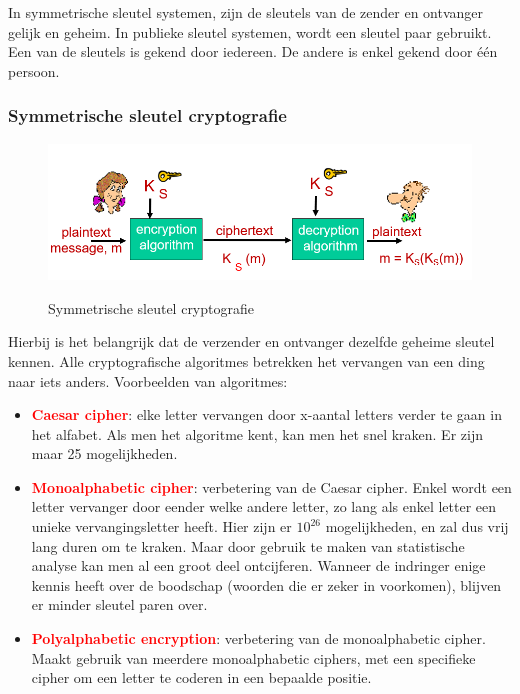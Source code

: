 In symmetrische sleutel systemen, zijn de sleutels van de zender en ontvanger gelijk en geheim.
In publieke sleutel systemen, wordt een sleutel paar gebruikt. Een van de sleutels is gekend door iedereen. De andere is enkel gekend door één persoon.

\subsubsection{Symmetrische sleutel cryptografie}

\begin{figure}[h]
    \centering
    \includegraphics[width=7in]{./img/imghfdst8/hfdst8puntje3.png}\\[1cm]
    \caption{Symmetrische sleutel cryptografie }      
    \label{fig:Symmetrische sleutel cryptografie }
\end{figure}


Hierbij is het belangrijk dat de verzender en ontvanger dezelfde geheime sleutel kennen.
Alle cryptografische algoritmes betrekken het vervangen van een ding naar iets anders.
Voorbeelden van algoritmes:
\begin{itemize}
    \item \textcolor{red}{\textbf{Caesar cipher}}: elke letter vervangen door x-aantal letters verder te gaan in het alfabet. Als men het algoritme kent, kan men het snel kraken. Er zijn maar 25 mogelijkheden.
    \item \textcolor{red}{\textbf{Monoalphabetic cipher}}: verbetering van de Caesar cipher. Enkel wordt een letter vervanger door eender welke andere letter, zo lang als enkel letter een unieke vervangingsletter heeft. Hier zijn er $10^{26}$ mogelijkheden, en zal dus vrij lang duren om te kraken. Maar door gebruik te maken van statistische analyse kan men al een groot deel ontcijferen. Wanneer de indringer enige kennis heeft over de boodschap (woorden die er zeker in voorkomen), blijven er minder sleutel paren over.
    \item \textcolor{red}{\textbf{Polyalphabetic encryption}}: verbetering van de monoalphabetic cipher. Maakt gebruik van meerdere monoalphabetic ciphers, met een specifieke cipher om een letter te coderen in een bepaalde positie.
\end{itemize}

